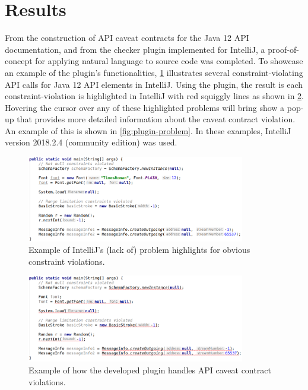 \section{Results}
\label{sec:contract-results}
From the construction of API caveat contracts for the Java 12 API documentation, and from the checker plugin implemented for IntelliJ, a proof-of-concept for applying natural language to source code was completed. To showcase an example of the plugin's functionalities, \ref{fig:plugin-inspection-off} illustrates several constraint-violating API calls for Java 12 API elements in IntelliJ. Using the plugin, the result is each constraint-violation is highlighted in IntelliJ with red squiggly lines as shown in \ref{fig:plugin-inspection-on}. Hovering the cursor over any of these highlighted problems will bring show a pop-up that provides more detailed information about the caveat contract violation. An example of this is shown in \ref{fig:plugin-problem}. In these examples, IntelliJ version 2018.2.4 (community edition) was used.

\begin{figure}
	\label{fig:plugin-inspection-off}
	\centering
	\includegraphics[width=0.85\textwidth]{figs/plugin-inspection-off.png}
	\caption{Example of IntelliJ's (lack of) problem highlights for obvious constraint violations.}
\end{figure}

\begin{figure}
	\label{fig:plugin-inspection-on}
	\centering
	\includegraphics[width=0.85\textwidth]{figs/plugin-inspection-on.png}
	\caption{Example of how the developed plugin handles API caveat contract violations.}
\end{figure}

